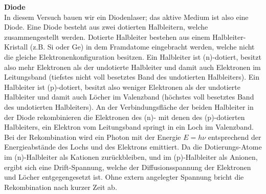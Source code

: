 \documentclass[a4paper,10pt]{scrartcl} %
\begin{document}
\textbf{Diode}\\
In diesem Versuch bauen wir ein Diodenlaser; das aktive Medium ist also eine Diode. Eine Diode besteht aus zwei dotierten Halbleitern, welche zusammengestellt werden. Dotierte Halbleiter bestehen aus einem Halbleiter-Kristall (z.B. Si oder Ge) in dem Framdatome eingebracht werden, welche nicht die gleiche Elektronenkonfiguration besitzen. Ein Halbleiter ist (n)-dotiert, besitzt also mehr Elektronen als der undotierte Halbleiter und damit auch Elektronen im Leitungsband (tiefstes nicht voll besetztes Band des undotierten Halbleiters). Ein Halbleiter ist (p)-dotiert, besitzt also weniger Elektronen als der undotierte Halbleiter und damit auch Löcher im Valenzband (höchstes voll besetztes Band des undotierten Halbleiters). An der Verbindungsfläche der beiden Halbleiter in der Diode rekombinieren die Elektronen des (n)- mit denen des (p)-dotierten Halbleiters, ein Elektron vom Leitungsband springt in ein Loch im Valenzband. Bei der Rekombination wird ein Photon mit der Energie $E = h \nu$ entsprechend der Energieabstände des Lochs und des Elektrons emittiert. Da die Dotierungs-Atome im (n)-Halbleiter als Kationen zurückbleiben, und im (p)-Halbleiter als Anionen, ergibt sich eine Drift-Spannung, welche der Diffusionsspannung der Elektronen und Löcher entgegengesetzt ist. Ohne extern angelegter Spannung bricht die Rekombination nach kurzer Zeit ab.\\
\end{document}
